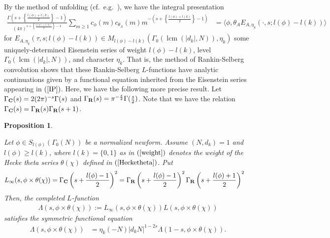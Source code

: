 \documentclass{amsart}
\newtheorem{proposition}[theorem]{Proposition}
\theoremstyle{definition}
\theoremstyle{definition}
\theoremstyle{definition}
\begin{document}
By the method of unfolding (cf.~e.g.~\cite[$\S$V.1]{GZ}), we have the integral presentation
\begin{align}\label{IP} \frac{ \Gamma \left( s + \left\lbrace \frac{l(\phi) + l(k) }{2}  \right\rbrace -1 \right) }{(4 \pi)^{s + \left\lbrace \frac{l(\phi) + l(k) }{2}  \right\rbrace -1}} 
\sum\limits_{m \geq 1} c_{\phi}(m) c_{{\theta}_A}(m) m^{ - \left( s + \left\lbrace \frac{l(\phi) + l(k) }{2}  \right\rbrace -1 \right)} 
&=\langle \phi, \theta_A E_{A, \eta_k}(\cdot, s; l(\phi) - l(k)) \rangle\end{align}
for $E_{A, \eta_k}(\tau, s; l(\phi) - l(k)) \in M_{l(\phi) - l(k)}(\Gamma_0( \operatorname{lcm}( \vert d_k \vert, N)), \eta_k)$ some uniquely-determined 
Eisenstein series of weight $l(\phi)-l(k)$, level $\Gamma_0( \operatorname{lcm}(\vert d_k \vert , N))$, and character $\eta_k$. 
That is, the method of Rankin-Selberg convolution shows that these Rankin-Selberg $L$-functions 
have analytic continuations given by a functional equation inherited from the Eisenstein series 
appearing in $(\ref{IP})$. Here, we have the following more precise result. Let $\Gamma_{\bf{C}}(s) = 2(2 \pi)^{-s} \Gamma(s)$
and $\Gamma_{\bf{R}}(s) = \pi^{-\frac{s}{2}}\Gamma(\frac{s}{2})$. Note that we have the relation $\Gamma_{\bf{C}}(s) = \Gamma_{\bf{R}}(s)\Gamma_{\bf{R}}(s+1)$.

\begin{proposition}\label{FE}

Let $\phi \in S_{l(\phi)}(\Gamma_0(N))$ be a normalized newform.
Assume $(N, d_k)=1$ and $l(\phi) \geq l(k)$, where $l(k) = \lbrace 0, 1 \rbrace$ as in $(\ref{weight})$ denotes the weight of the 
Hecke theta series $\theta(\chi)$ defined in $(\ref{Hecketheta})$. Put 
\begin{align*} L_{\infty}(s, \phi \times \theta(\chi)) &= \Gamma_{\bf{C}} \left( s +  \frac{l(\phi) -1}{2}  \right)^2
= \Gamma_{\bf{R}} \left( s +  \frac{l(\phi) -1}{2}  \right)^2 \Gamma_{\bf{R}}\left( s + \frac{l(\phi) +1}{2} \right)^2 \end{align*}
Then, the completed $L$-function 
\begin{align*} \Lambda(s, \phi \times \theta(\chi)) := L_{\infty}(s, \phi \times \theta(\chi)) L(s, \phi \times \theta(\chi)) \end{align*}
satisfies the symmetric functional equation 
\begin{align*} \Lambda(s, \phi \times \theta(\chi)) 
&= \eta_k(-N) \vert d_k N \vert^{1-2s}  \Lambda(1-s, \phi \times \theta(\chi)). \end{align*} \end{proposition}
\end{document}
